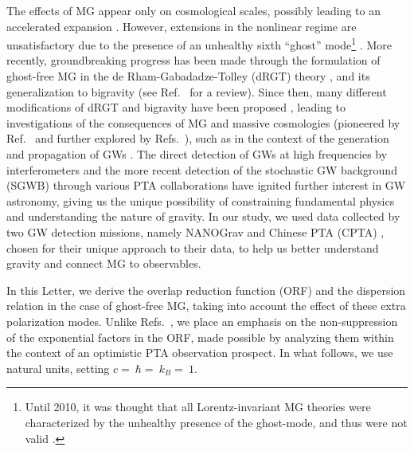 \documentclass[10pt,prd,twocolumn,aps,nofootinbib,nobibnotes,superscriptaddress,preprintnumbers]{revtex4-2}
\begin{document}
The effects of MG appear only on cosmological scales, possibly leading to an accelerated expansion \cite{DAmico:2011eto}. However, extensions in the nonlinear regime are unsatisfactory due to the presence of an unhealthy sixth ``ghost'' mode\footnote{Until 2010, it was thought that all Lorentz-invariant MG theories were characterized by the unhealthy presence of the ghost-mode, and thus were not valid \cite{deRham:2010kj}.} \cite{Boulware:1972yco}. More recently, groundbreaking progress has been made through the formulation of ghost-free MG in the de Rham-Gabadadze-Tolley (dRGT) theory \cite{deRham:2010ik,deRham:2010kj}, and its generalization to bigravity \cite{Hassan:2011zd} (see Ref.~\cite{deRham:2023ngf} for a review). Since then, many different modifications of dRGT and bigravity have been proposed \cite{Hinterbichler:2011tt,deRham:2014zqa,Koyama:2015vza,deRham:2016nuf,Hinterbichler:2016try, Cusin:2016ytz, Kenna-Allison:2019tbu, Kazempour:2022giy},  
leading to investigations of the consequences of MG and massive cosmologies (pioneered by Ref.~\cite{DAmico:2011eto} and further explored by Refs.~\cite{Gratia:2012wt,Gumrukcuoglu:2012aa,Maeda:2013bha,Akrami:2013pna,Zhang:2013noa,Lambiase:2012fv,Koyama:2011wx,Tasinato:2012ze, Solomon:2014iwa, Akrami:2013ffa,Koennig:2014ods,Gumrukcuoglu:2016hic, Heisenberg:2024uwq, Smirnov:2025yru, Comelli:2013tja}),
such as in the context of the generation and propagation of GWs \cite{DeFelice:2013awa,Gumrukcuoglu:2013nza,DeFelice:2013bxa,DeFelice:2015moy,Babichev:2015xha,Sakstein:2017bws}. 
The direct detection of GWs at high frequencies by interferometers \cite{LIGOScientific:2016aoc,LIGOScientific:2016sjg, KAGRA:2020agh, VIRGO:2014yos} and the more recent detection of the stochastic GW background (SGWB) through various PTA collaborations \cite{Agazie:2023, Xu:2023wog,EPTA:2023sfo,EPTA:2023akd,EPTA:2023fyk, Zic:2023gta,Reardon:2023gzh} have ignited further interest in GW astronomy, giving us the unique possibility of constraining fundamental physics and understanding the nature of gravity. 
In our study, we used data collected by two GW detection missions, namely NANOGrav \cite{Agazie:2023} and Chinese PTA (CPTA) \cite{Xu:2023wog}, chosen for their unique approach to their data, to help us better understand gravity and connect MG to observables. 


In this Letter, we derive the overlap reduction function (ORF) and the dispersion relation in the case of ghost-free MG, taking into account the effect of these extra polarization modes. 
Unlike Refs.~\cite{Liang:2021bct, Anholm:2008wy, Arjona:2024cex, Lee:2013awh}, we place an emphasis on the non-suppression of the exponential factors in the ORF, made possible by analyzing them within the context of an optimistic PTA observation prospect. In what follows, we use natural units, setting $c = $$\ \hbar = $$\ k_B = $$\ 1$.
\end{document}
